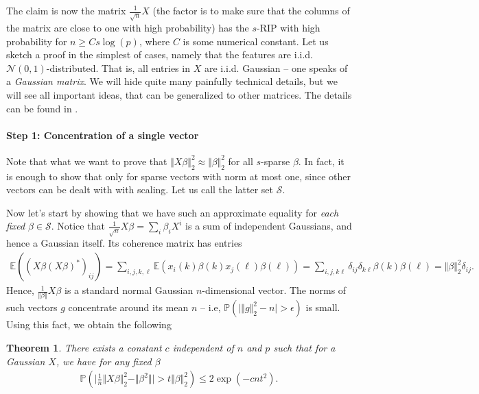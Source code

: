 \documentclass{article}
\newcommand{\calS}{\mathcal{S}}
\newtheorem{theorem}{Theorem}
\newcommand{\abs}[1]{\vert #1 \vert}
\newcommand{\norm}[1]{\Vert #1 \Vert}
\begin{document}
The claim is now the matrix $\tfrac{1}{\sqrt{n}}X$ (the factor is to make sure that the columns of the matrix are close to one with high probability) has the $s$-RIP with high probability for $n \geq C s\log(p)$, where $C$ is some numerical constant. Let us sketch a proof in the simplest of cases, namely that the features are i.i.d. $\mathcal{N}(0,1)$-distributed. That is, all entries in $X$ are i.i.d. Gaussian -- one speaks of a \emph{Gaussian matrix}. We will hide quite many painfully technical details, but we will see all important ideas, that can be generalized to other matrices. The details can be found in \cite[Ch. 9.1]{foucart2011hard}.

\paragraph{Step 1: Concentration of a single vector} Note that what we want to prove that $\norm{X\beta}_2^2 \approx \norm{\beta}_2^2$ for all $s$-sparse $\beta$. In fact, it is enough to show that only for sparse vectors with norm at most one, since other vectors can be dealt with with scaling. Let us call the latter set $\calS$.

Now let's start by showing that we have such an approximate equality for \emph{each fixed} $\beta\in \calS$. Notice that  $\tfrac{1}{\sqrt{n}} X\beta = \sum_{i} \beta_i X^i$ is a sum of independent Gaussians, and hence a Gaussian itself. Its coherence matrix has entries
\begin{align*}
    \mathbb{E}((X\beta(X\beta)^*)_{ij}) = \sum_{i,j,k,\ell} \mathbb{E}(x_i(k) \beta(k) x_j(\ell) \beta(\ell)) =  \sum_{i,j,k\ell} \delta_{ij}\delta_{k\ell} \beta(k) \beta(\ell) = \norm{\beta}_2^2 \delta_{ij}.
\end{align*}
Hence, $\frac{1}{\norm{\beta}}X\beta$ is a standard normal Gaussian $n$-dimensional vector. The norms of such vectors $g$ concentrate around its mean $n$ -- i.e, $\mathbb{P}( \abs{\norm{g}_2^2 - n}> \epsilon)$ is small. Using this fact, we obtain the following
\begin{theorem}
    There exists a constant $c$ independent of $n$ and $p$ such that for a Gaussian $X$, we have for any fixed $\beta$
    \begin{align}
        \mathbb{P}(\abs{\frac{1}{n} \norm{X\beta}_2^2 - \norm{\beta^2}} >t\norm{\beta}^2_2) \leq 2\exp(-cnt^2). \label{eq:conc}
    \end{align}
\end{theorem}
\end{document}
